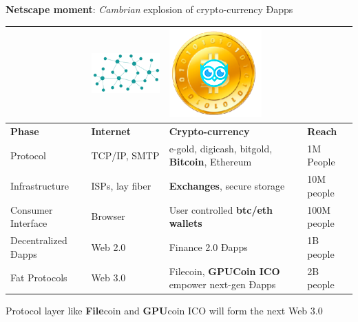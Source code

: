 \textbf{Netscape moment}: \emph{Cambrian} explosion of crypto-currency Ðapps
 

 \begin{adjustbox}{width=.7\textwidth}
\begin{tabularx} {\textwidth}{|X|X|X|X|}
 \hline
& \includegraphics[scale=0.2]{static/decentnew} & \includegraphics[scale=0.2]{static/hootcoin} & \\
 \hline
\textbf{Phase} & \textbf{Internet} & \textbf{Crypto-currency} & \textbf{Reach}\\
\hline
Protocol & TCP/IP, SMTP & e-gold, digicash, bitgold, \textbf{Bitcoin}, Ethereum & 1M People \\
\hline
Infrastructure & ISPs, lay fiber & \textbf{Exchanges}, secure storage & 10M people \\
\hline
Consumer Interface & Browser & User controlled \textbf{btc/eth wallets} & 100M people \\
\hline
Decentralized Ðapps & Web 2.0 & Finance 2.0 Ðapps & 1B people\\
\hline
Fat Protocols & Web 3.0 & Filecoin, \textbf{GPUCoin ICO} empower next-gen Ðapps & 2B people\\

\hline
\end{tabularx}
\end{adjustbox}

Protocol layer like \textbf{File}coin and \textbf{GPU}coin ICO will form the next Web 3.0